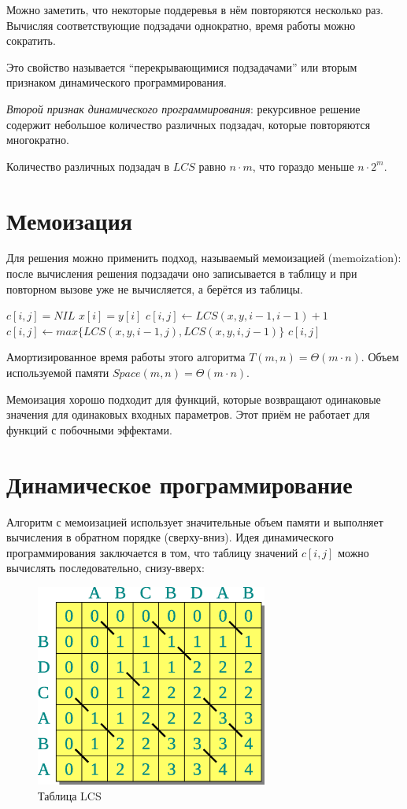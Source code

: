 \documentclass[a4paper,11pt]{article}
\begin{document}
Можно заметить, что некоторые поддеревья в нём повторяются несколько раз.
Вычисляя соответствующие подзадачи однократно, время работы можно сократить.

Это свойство называется ``перекрывающимися подзадачами'' или вторым признаком
динамического программирования.

\emph{Второй признак динамического программирования}: рекурсивное решение
содержит небольшое количество различных подзадач, которые повторяются многократно.

Количество различных подзадач в $LCS$ равно $n \cdot m$, что гораздо меньше
 $n \cdot 2^m$.

\section{Мемоизация}
Для решения можно применить подход, называемый мемоизацией (memoization): после
вычисления решения подзадачи оно записывается в таблицу и при повторном вызове
уже не вычисляется, а берётся из таблицы.

\begin{codebox}
\li \If $c[i,j] = NIL$
\li \Then \If $x[i] = y[i]$
\li     \Then $c[i,j] \gets LCS(x, y, i-1, i-1)+1$
\li     \Else $c[i,j] \gets max\{LCS(x, y, i-1, j), LCS(x, y, i, j-1)\}$
      \End
    \End
\li \Return $c[i,j]$
\end{codebox}
Амортизированное время работы этого алгоритма $T(m, n) = \Theta(m \cdot n)$.
Объем используемой памяти $Space(m, n) = \Theta(m \cdot n)$.

Мемоизация хорошо подходит для функций, которые возвращают одинаковые значения
для одинаковых входных параметров. Этот приём не работает для функций с
побочными эффектами.

\section{Динамическое программирование}
Алгоритм с мемоизацией использует значительные объем памяти и выполняет
вычисления в обратном порядке (сверху-вниз). Идея динамического программирования
заключается в том, что таблицу значений $c[i, j]$ можно вычислять
последовательно, снизу-вверх:
\begin{figure}[h!]
  \centering
  \includegraphics[width=3in]{lecture8/table1.eps}
  \caption{Таблица LCS}
\end{figure}
\end{document}
